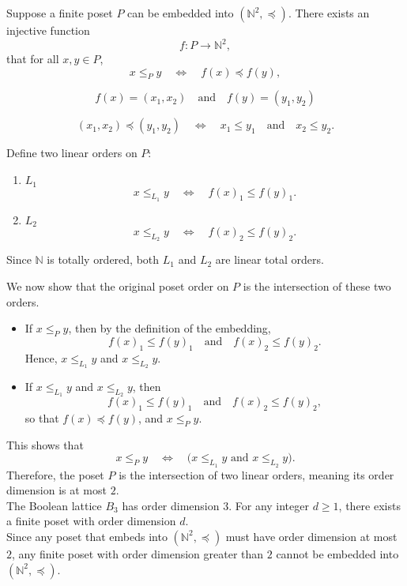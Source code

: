 \documentclass{report}
\begin{document}
\begin{proofWithHibiscus}
  Suppose a finite poset $P$ can be embedded into $(\mathbb{N}^2, \preceq)$. There exists an injective function
  \[ f: P \to \mathbb{N}^2, \]
 that for all $x,y\in P$,
  \[ x \le_P y \quad \Longleftrightarrow \quad f(x) \preceq f(y), \]
  
  \[ f(x) = (x_1,x_2) \quad \text{and} \quad f(y) = (y_1,y_2)\] 

  \[ (x_1,x_2) \preceq (y_1,y_2) \quad \Longleftrightarrow \quad x_1 \le y_1 \quad \text{and} \quad x_2 \le y_2. \]

  Define two linear orders on $P$:
  \begin{enumerate}
      \item $L_1$
      \[
      x \le_{L_1} y \quad \Longleftrightarrow \quad f(x)_1 \le f(y)_1.
      \]
      \item $L_2$
      \[
      x \le_{L_2} y \quad \Longleftrightarrow \quad f(x)_2 \le f(y)_2.
      \]
  \end{enumerate}
  Since $\mathbb{N}$ is totally ordered, both $L_1$ and $L_2$ are linear total orders.

  We now show that the original poset order on $P$ is the intersection of these two orders. 
  \begin{itemize}
      \item If $x \le_P y$, then by the definition of the embedding, 
      \[
      f(x)_1 \le f(y)_1 \quad \text{and} \quad f(x)_2 \le f(y)_2.
      \]
      Hence, $x \le_{L_1} y$ and $x \le_{L_2} y$.
      \item If $x \le_{L_1} y$ and $x \le_{L_2} y$, then
      \[
      f(x)_1 \le f(y)_1 \quad \text{and} \quad f(x)_2 \le f(y)_2,
      \]
      so that $f(x) \preceq f(y)$, and $x \le_P y$.
  \end{itemize}

  This shows that
  \[
  x \le_P y \quad \Longleftrightarrow \quad \bigl( x \le_{L_1} y \text{ and } x \le_{L_2} y \bigr).
  \]
  Therefore, the poset $P$ is the intersection of two linear orders, meaning its order dimension is at most $2$. \\

  The Boolean lattice $B_3$ has order dimension $3$. For any integer $d \ge 1$, there exists a finite poset with order dimension $d$.\\

  Since any poset that embeds into $(\mathbb{N}^2, \preceq)$ must have order dimension at most $2$, any finite poset with order dimension greater than $2$ cannot be embedded into $(\mathbb{N}^2, \preceq)$. 

\end{proofWithHibiscus}
\end{document}
